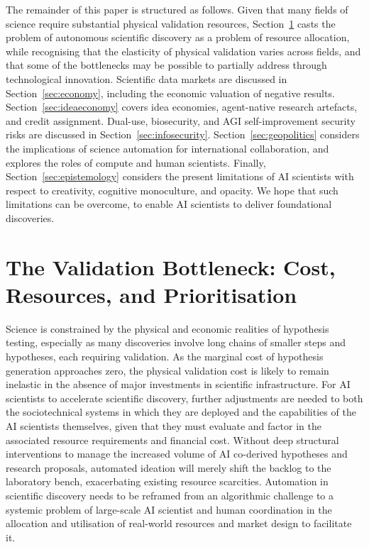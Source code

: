 \documentclass[11pt, a4paper, twocolumn, goog]{google}
\begin{document}
The remainder of this paper is structured as follows. Given that many fields of science require substantial physical validation resources, Section~\ref{sec:validation} casts the problem of autonomous scientific discovery as a problem of resource allocation, while recognising that the elasticity of physical validation varies across fields, and that some of the bottlenecks may be possible to partially address through technological innovation. Scientific data markets are discussed in Section~\ref{sec:economy}, including the economic valuation of negative results. Section~\ref{sec:ideaeconomy} covers idea economies, agent-native research artefacts, and credit assignment. Dual-use, biosecurity, and AGI self-improvement security risks are discussed in Section~\ref{sec:infosecurity}. Section~\ref{sec:geopolitics} considers the implications of science automation for international collaboration, and explores the roles of compute and human scientists. Finally, Section~\ref{sec:epistemology} considers the present limitations of AI scientists with respect to creativity, cognitive monoculture, and opacity. We hope that such limitations can be overcome, to enable AI scientists to deliver foundational discoveries.

\section{The Validation Bottleneck: Cost, Resources, and Prioritisation}
\label{sec:validation}

Science is constrained by the physical and economic realities of hypothesis testing, especially as many discoveries involve long chains of smaller steps and hypotheses, each requiring validation. As the marginal cost of hypothesis generation approaches zero, the physical validation cost is likely to remain inelastic in the absence of major investments in scientific infrastructure. For AI scientists to accelerate scientific discovery, further adjustments are needed to both the sociotechnical systems in which they are deployed and the capabilities of the AI scientists themselves, given that they must evaluate and factor in the associated resource requirements and financial cost. Without deep structural interventions to manage the increased volume of AI co-derived hypotheses and research proposals, automated ideation will merely shift the backlog to the laboratory bench, exacerbating existing resource scarcities. Automation in scientific discovery needs to be reframed from an algorithmic challenge to a systemic problem of large-scale AI scientist and human coordination in the allocation and utilisation of real-world resources and market design to facilitate it.
\end{document}
